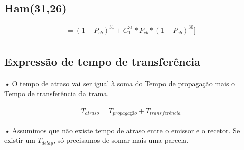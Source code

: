 \documentclass[13pt,a4paper]{report}
\begin{document}
	
\paragraph{}
\subsection{Ham(31,26)}

\paragraph{}
\begin{equation}
	= (1 - P_{eb})^{31} + C_{1}^{31} * P_{eb} * (1 - P_{eb})^{30}]
\end{equation}
\paragraph{}	


\section{}

\subsection{Expressão de tempo de transferência}

\paragraph{}
\emph{•} O tempo de atraso vai ser igual à soma do Tempo de propagação mais o Tempo de transferência da trama.

\paragraph{}
\begin{Large}
\begin{equation}
T_{atraso} = T_{propagação} + T_{transferência}
\end{equation}
\end{Large}	

\paragraph{}
\emph{•} Assumimos que não existe tempo de atraso entre o emissor e o recetor. Se existir um $T_{delay}$, só precisamos de somar mais uma parcela.
\end{document}
